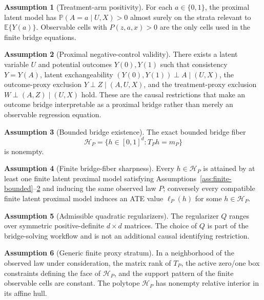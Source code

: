 \documentclass[11pt]{article}
\newcommand{\E}{\mathbb{E}}
\renewcommand{\Pr}{\mathbb{P}}
\newcommand{\calH}{\mathcal{H}}
\theoremstyle{definition}
\newtheorem{assumption}{Assumption}
\theoremstyle{plain}
\theoremstyle{remark}
\begin{document}
\begin{assumption}[Treatment-arm positivity]\label{ass:positivity}
For each \(a\in\{0,1\}\), the proximal latent model has
\(\Pr(A=a\mid U,X)>0\) almost surely on the strata relevant to
\(\E\{Y(a)\}\).  Observable cells with \(P(z,a,x)>0\) are the only cells used
in the finite bridge equations.
\end{assumption}

\begin{assumption}[Proximal negative-control validity]\label{ass:proximal-valid}
There exists a latent variable \(U\) and potential outcomes \(Y(0),Y(1)\)
such that consistency \(Y=Y(A)\), latent exchangeability
\((Y(0),Y(1))\perp A\mid(U,X)\), the outcome-proxy exclusion
\(Y\perp Z\mid(A,U,X)\), and the treatment-proxy exclusion
\(W\perp(A,Z)\mid(U,X)\) hold.  These are the causal restrictions that make
an outcome bridge interpretable as a proximal bridge rather than merely an
observable regression equation.
\end{assumption}

\begin{assumption}[Bounded bridge existence]\label{ass:bridge-exists}
The exact bounded bridge fiber
\[
  \calH_P=\{h\in[0,1]^d:T_Ph=m_P\}
\]
is nonempty.
\end{assumption}

\begin{assumption}[Finite bridge-fiber sharpness]\label{ass:fiber-sharp}
Every \(h\in\calH_P\) is attained by at least one finite latent proximal
model satisfying Assumptions~\ref{ass:finite-bounded}--\ref{ass:proximal-valid}
and inducing the same observed law \(P\); conversely every compatible finite
latent proximal model induces an ATE value \(\ell_P(h)\) for some
\(h\in\calH_P\).
\end{assumption}

\begin{assumption}[Admissible quadratic regularizers]\label{ass:admissible-Q}
The regularizer \(Q\) ranges over symmetric positive-definite \(d\times d\)
matrices.  The choice of \(Q\) is part of the bridge-solving workflow and is
not an additional causal identifying restriction.
\end{assumption}

\begin{assumption}[Generic finite proxy stratum]\label{ass:generic-stratum}
In a neighborhood of the observed law under consideration, the matrix rank of
\(T_P\), the active zero/one box constraints defining the face of
\(\calH_P\), and the support pattern of the finite observable cells are
constant.  The polytope \(\calH_P\) has nonempty relative interior in its
affine hull.
\end{assumption}
\end{document}
